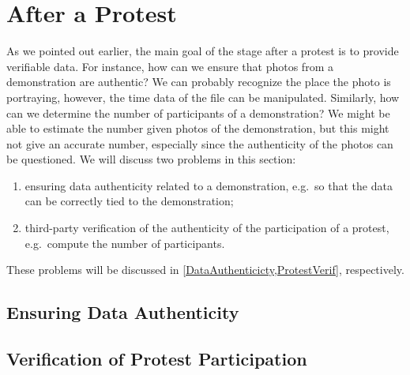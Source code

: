 \section{After a Protest}
\label{AfterProtest}

As we pointed out earlier, the main goal of the stage after a protest is to 
provide verifiable data.
For instance, how can we ensure that photos from a demonstration are authentic?
We can probably recognize the place the photo is portraying, however, the time 
data of the file can be manipulated.
Similarly, how can we determine the number of participants of a demonstration?
We might be able to estimate the number given photos of the demonstration, but 
this might not give an accurate number, especially since the authenticity of 
the photos can be questioned.
We will discuss two problems in this section:
\begin{enumerate}
  \item ensuring data authenticity related to a demonstration, e.g.\ so that 
    the data can be correctly tied to the demonstration;
  \item third-party verification of the authenticity of the participation of 
    a protest, e.g.\ compute the number of participants.
\end{enumerate}

These problems will be discussed in \cref{DataAuthenticicty,ProtestVerif}, 
respectively.

\subsection{Ensuring Data Authenticity}
\label{DataAuthenticicty}



\subsection{Verification of Protest Participation}
\label{ProtestVerif}


